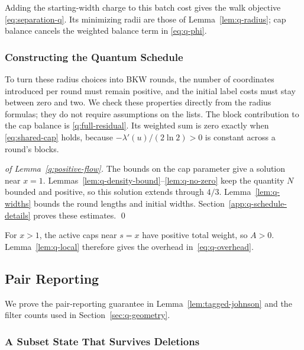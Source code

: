 \documentclass[runningheads,envcountsame,envcountsect,orivec]{llncs}
\begin{document}
Adding the starting-width charge to this batch cost gives
the walk objective \eqref{eq:separation-q}. Its minimizing
radii are those of Lemma~\ref{lem:q-radius}; cap balance
cancels the weighted balance term in \eqref{eq:q-phi}.

\subsubsection{Constructing the Quantum Schedule}


To turn these radius choices into BKW rounds, the number of
coordinates introduced per round must remain positive, and the
initial label costs must stay between zero and two. We check
these properties directly from the radius formulas; they do
not require assumptions on the lists. The block contribution
to the cap balance is \eqref{q:full-residual}. Its weighted sum
is zero exactly when \eqref{eq:shared-cap} holds, because
$-\lambda'(u)/(2\ln2)>0$ is constant across a round's blocks.



\begin{proof}[of Lemma~\ref{q:positive-flow}]
The bounds on the cap parameter give a solution near $x=1$.
Lemmas~\ref{lem:q-density-bound}--\ref{lem:q-no-zero} keep the
quantity $N$ bounded and positive, so this solution
extends through $4/3$.
Lemma~\ref{lem:q-widths} bounds the round lengths and initial
widths. Section~\ref{app:q-schedule-details} proves these estimates.
\qed
\end{proof}

For $x>1$, the active caps near $s=x$ have positive total
weight, so $A>0$. Lemma~\ref{lem:q-local} therefore gives the overhead in~\eqref{eq:q-overhead}.






\subsection{Pair Reporting}
\label{app:quantum-reporting}

We prove the pair-reporting guarantee in Lemma~\ref{lem:tagged-johnson}
and the filter counts used in Section~\ref{sec:q-geometry}.

\subsubsection{A Subset State That Survives Deletions}
\end{document}
